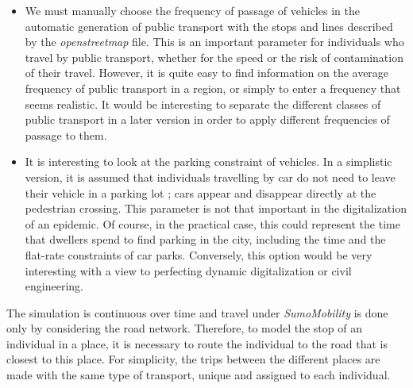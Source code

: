 \begin{itemize}

\item We must manually choose the frequency of passage of vehicles in the automatic generation of public transport with the stops and lines described by the \textit{openstreetmap} file. This is an important parameter for individuals who travel by public transport, whether for the speed or the risk of contamination of their travel. However, it is quite easy to find information on the average frequency of public transport in a region, or simply to enter a frequency that seems realistic. It would be interesting to separate the different classes of public transport in a later version in order to apply different frequencies of passage to them.\\

\item It is interesting to look at the parking constraint of vehicles. In a simplistic version, it is assumed that individuals travelling by car do not need to leave their vehicle in a parking lot ; cars appear and disappear directly at the pedestrian crossing. This parameter is not that important in the  digitalization of an epidemic. Of course, in the practical case, this could represent the time that dwellers spend to find parking in the city, including the time and the flat-rate constraints of car parks. Conversely, this option would be very interesting with a view to perfecting dynamic digitalization or civil engineering.\\

\end{itemize}

The simulation is continuous over time and travel under \textit{SumoMobility} is done only by considering the road network. Therefore, to model the stop of an individual in a place, it is necessary to route the individual to the road that is closest to this place. For simplicity, the trips between the different places are made with the same type of transport, unique and assigned to each individual.\\


